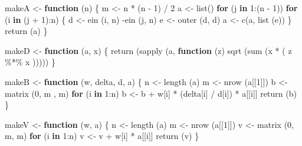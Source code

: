 \documentclass[
  12pt,
]{book}
\newenvironment{Shaded}{\begin{snugshade}}{\end{snugshade}}
\newcommand{\ControlFlowTok}[1]{\textcolor[rgb]{0.13,0.29,0.53}{\textbf{#1}}}
\newcommand{\DecValTok}[1]{\textcolor[rgb]{0.00,0.00,0.81}{#1}}
\newcommand{\FunctionTok}[1]{\textcolor[rgb]{0.00,0.00,0.00}{#1}}
\newcommand{\NormalTok}[1]{#1}
\newcommand{\OtherTok}[1]{\textcolor[rgb]{0.56,0.35,0.01}{#1}}
\newcommand{\SpecialCharTok}[1]{\textcolor[rgb]{0.00,0.00,0.00}{#1}}
\theoremstyle{definition}
\theoremstyle{definition}
\theoremstyle{definition}
\theoremstyle{definition}
\theoremstyle{remark}
\begin{document}
\begin{Shaded}
\begin{Highlighting}[]
\NormalTok{makeA }\OtherTok{\textless{}{-}} \ControlFlowTok{function}\NormalTok{ (n) \{}
\NormalTok{  m }\OtherTok{\textless{}{-}}\NormalTok{ n }\SpecialCharTok{*}\NormalTok{ (n }\SpecialCharTok{{-}} \DecValTok{1}\NormalTok{) }\SpecialCharTok{/} \DecValTok{2}
\NormalTok{  a }\OtherTok{\textless{}{-}} \FunctionTok{list}\NormalTok{()}
  \ControlFlowTok{for}\NormalTok{ (j }\ControlFlowTok{in} \DecValTok{1}\SpecialCharTok{:}\NormalTok{(n }\SpecialCharTok{{-}} \DecValTok{1}\NormalTok{))}
    \ControlFlowTok{for}\NormalTok{ (i }\ControlFlowTok{in}\NormalTok{ (j }\SpecialCharTok{+} \DecValTok{1}\NormalTok{)}\SpecialCharTok{:}\NormalTok{n) \{}
\NormalTok{      d }\OtherTok{\textless{}{-}} \FunctionTok{ein}\NormalTok{ (i, n) }\SpecialCharTok{{-}}\FunctionTok{ein}\NormalTok{ (j, n)}
\NormalTok{      e }\OtherTok{\textless{}{-}} \FunctionTok{outer}\NormalTok{ (d, d)}
\NormalTok{      a }\OtherTok{\textless{}{-}} \FunctionTok{c}\NormalTok{(a, }\FunctionTok{list}\NormalTok{ (e))}
\NormalTok{    \}}
  \FunctionTok{return}\NormalTok{ (a)}
\NormalTok{\}}

\NormalTok{makeD }\OtherTok{\textless{}{-}} \ControlFlowTok{function}\NormalTok{ (a, x) \{}
  \FunctionTok{return}\NormalTok{ (}\FunctionTok{sapply}\NormalTok{ (a, }\ControlFlowTok{function}\NormalTok{ (z)}
    \FunctionTok{sqrt}\NormalTok{ (}\FunctionTok{sum}\NormalTok{ (x }\SpecialCharTok{*}\NormalTok{ (}
\NormalTok{      z }\SpecialCharTok{\%*\%}\NormalTok{ x}
\NormalTok{    )))))}
\NormalTok{\}}

\NormalTok{makeB }\OtherTok{\textless{}{-}} \ControlFlowTok{function}\NormalTok{ (w, delta, d, a) \{}
\NormalTok{  n }\OtherTok{\textless{}{-}} \FunctionTok{length}\NormalTok{ (a)}
\NormalTok{  m }\OtherTok{\textless{}{-}} \FunctionTok{nrow}\NormalTok{ (a[[}\DecValTok{1}\NormalTok{]])}
\NormalTok{  b }\OtherTok{\textless{}{-}} \FunctionTok{matrix}\NormalTok{ (}\DecValTok{0}\NormalTok{, m , m)}
  \ControlFlowTok{for}\NormalTok{ (i }\ControlFlowTok{in} \DecValTok{1}\SpecialCharTok{:}\NormalTok{n)}
\NormalTok{    b }\OtherTok{\textless{}{-}}\NormalTok{ b }\SpecialCharTok{+}\NormalTok{ w[i] }\SpecialCharTok{*}\NormalTok{ (delta[i] }\SpecialCharTok{/}\NormalTok{ d[i]) }\SpecialCharTok{*}\NormalTok{ a[[i]]}
  \FunctionTok{return}\NormalTok{ (b)}
\NormalTok{\}}

\NormalTok{makeV }\OtherTok{\textless{}{-}} \ControlFlowTok{function}\NormalTok{ (w, a) \{}
\NormalTok{  n }\OtherTok{\textless{}{-}} \FunctionTok{length}\NormalTok{ (a)}
\NormalTok{  m }\OtherTok{\textless{}{-}} \FunctionTok{nrow}\NormalTok{ (a[[}\DecValTok{1}\NormalTok{]])}
\NormalTok{  v }\OtherTok{\textless{}{-}} \FunctionTok{matrix}\NormalTok{ (}\DecValTok{0}\NormalTok{, m, m)}
  \ControlFlowTok{for}\NormalTok{ (i }\ControlFlowTok{in} \DecValTok{1}\SpecialCharTok{:}\NormalTok{n)}
\NormalTok{    v }\OtherTok{\textless{}{-}}\NormalTok{ v }\SpecialCharTok{+}\NormalTok{ w[i] }\SpecialCharTok{*}\NormalTok{ a[[i]]}
  \FunctionTok{return}\NormalTok{ (v)}
\NormalTok{\}}


\end{Highlighting}
\end{Shaded}
\end{document}
